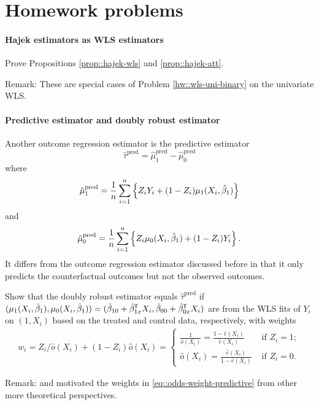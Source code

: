 \section{Homework problems}

\paragraph{Hajek estimators as WLS estimators}\label{hw::ate-hajek-wls}

Prove Propositions \ref{prop::hajek-wls} and \ref{prop::hajek-att}. 

Remark: These are special cases of Problem \ref{hw::wls-uni-binary} on the univariate WLS. 

 
\paragraph{Predictive estimator and doubly robust estimator}\label{hw::dr-projective-estimator}

Another outcome regression estimator is the predictive estimator
$$
\hat{\tau}^\text{pred} = 
\hat{\mu}_1^\text{pred} - \hat{\mu}_0^\text{pred} 
$$
where
$$
\hat{\mu}_1^\text{pred} = 
\frac{1}{n} \sum_{i=1}^n \left\{  Z_i Y_i + (1-Z_i)  \mu_1(X_i, \hat{\beta}_1)   \right\}
$$
and
$$
\hat{\mu}_0^\text{pred}  = 
\frac{1}{n} \sum_{i=1}^n \left\{  Z_i \mu_0(X_i, \hat{\beta}_1) + (1-Z_i) Y_i  \right\} .
$$
It differs from the outcome regression estimator discussed before in that it only predicts the counterfactual outcomes but not the observed outcomes. 

Show that the doubly robust estimator  equals $\hat{\tau}^\text{pred} $ if $(\mu_1(X_i, \hat{\beta}_1), \mu_0(X_i, \hat{\beta}_1) ) =  
( \hat \beta_{10} +   \hat \beta_{1x}^{\mkern-1.5mu\mathsf{T}} X_i, \hat \beta_{00} +   \hat\beta_{0x}^{\mkern-1.5mu\mathsf{T}} X_i)$ are from the WLS fits of $Y_i$ on $(1, X_i)$ based on the treated and control data, respectively, with weights
\begin{eqnarray}
\label{eq::odds-weight-predictive}
w_i =  Z_i/\hat{o}(X_i) + (1-Z_i) \hat{o}(X_i)
= \begin{cases}
\frac{1}{\hat{o}(X_i)} = \frac{ 1-  \hat{e}(X_i) }{ \hat{e}(X_i) } & \text{ if } Z_i=1;\\
 \hat{o}(X_i) = \frac{  \hat{e}(X_i)  }{ 1-\hat{e}(X_i)} & \text{ if } Z_i=0.
\end{cases} 
\end{eqnarray}

Remark: 
\citet{cao2009improving} and  \citet{vermeulen2015bias} motivated the weights in \eqref{eq::odds-weight-predictive} from other more theoretical perspectives. 



